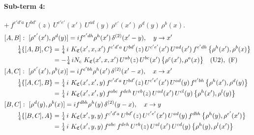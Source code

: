 \documentclass[10pt]{article}
\numberwithin{equation}{section}
\begin{document}
\paragraph{Sub-term 4:} $+\,f^{c'd'a}\,U^{bd'}(z)\,U^{c'e'}(x')\,U^{ad}(y)\,\rho^{e'}(x')\,\rho^{d}(y)\,\rho^{b}(x)$.
\begin{align}
&[A,B]:\ [\rho^{e'}(x'),\rho^{d}(y)]=i f^{e'dh}\rho^{h}(x')\,\delta^{(2)}(x'-y),\quad y\to x'\notag\\
&\qquad \tfrac14\{[A,B],C\}=\tfrac14\,i\,\,K_{\mathfrak C}(x',x,x')\,f^{c'd'a}\,U^{bd'}(z)\,U^{c'e'}(x')\,U^{ad}(x')\,f^{e'dh}\,\big\{\rho^{h}(x'),\rho^{b}(x)\big\}\notag\\
&\qquad\phantom{\tfrac14\{[A,B],C\}}=-\tfrac14\,i N_{c}\,\,K_{\mathfrak C}(x',x,x')\,U^{ab}(z)\,U^{bc}(x')\,\big\{\rho^{c}(x'),\rho^{a}(x)\big\}\quad\text{(U2)},\ \text{(F)}
\label{eq:GIII.VI-4-AB}\\
&[A,C]:\ [\rho^{e'}(x'),\rho^{b}(x)]=i f^{e'bh}\rho^{h}(x')\,\delta^{(2)}(x'-x),\quad x\to x'\notag\\
&\qquad \tfrac14\{[A,C],B\}=\tfrac14\,i\,\,K_{\mathfrak C}(x',x',y)\,f^{c'd'a}\,U^{bd'}(z)\,U^{c'e'}(x')\,U^{ad}(y)\,f^{e'bh}\,\big\{\rho^{h}(x'),\rho^{d}(y)\big\}\notag\\
&\qquad\phantom{\tfrac14\{[A,C],B\}}=\tfrac14\,i\,\,K_{\mathfrak C}(x',x',y)\,f^{abc}\,f^{deh}\,U^{eb}(z)\,U^{ad}(x')\,U^{cl}(y)\,\big\{\rho^{h}(x'),\rho^{l}(y)\big\}
\label{eq:GIII.VI-4-AC}\\
&[B,C]:\ [\rho^{d}(y),\rho^{b}(x)]=i f^{dbh}\rho^{h}(y)\,\delta^{(2)}(y-x),\quad x\to y\notag\\
&\qquad \tfrac14\{[B,C],A\}=\tfrac14\,i\,\,K_{\mathfrak C}(x',y,y)\,f^{c'd'a}\,U^{bd'}(z)\,U^{c'e'}(x')\,U^{ad}(y)\,f^{dbh}\,\big\{\rho^{h}(y),\rho^{e'}(x')\big\}\notag\\
&\qquad\phantom{\tfrac14\{[B,C],A\}}=\tfrac14\,i\,\,K_{\mathfrak C}(x',y,y)\,f^{abc}\,f^{deh}\,U^{eb}(z)\,U^{al}(x')\,U^{cd}(y)\,\big\{\rho^{h}(y),\rho^{l}(x')\big\}
\label{eq:GIII.VI-4-BC}
\end{align}
\end{document}
